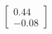 \documentclass[preview]{standalone}
\begin{document}
\begin{align*}
\begin{bmatrix} 0.44 \\ -0.08 \end{bmatrix}
\end{align*}
\end{document}
